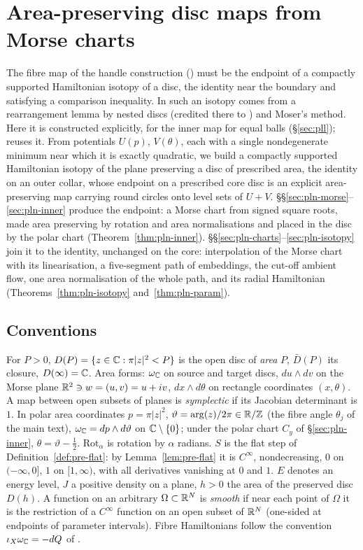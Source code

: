 \section{Area-preserving disc maps from Morse charts}\label{sec:pln}

The fibre map of the handle construction () must be the endpoint of a compactly supported Hamiltonian isotopy of a disc, the identity near the boundary and satisfying a comparison inequality. In \cite{OpenAI2026} such an isotopy comes from a rearrangement lemma by nested discs (credited there to \cite[Lemma~3.2]{SchlenkFolding}) and Moser's method. Here it is constructed explicitly, for the inner map for equal balls (\S\ref{sec:pll}); \cite{SongHD} reuses it. From potentials $U(p)$, $V(\theta)$, each with a single nondegenerate minimum near which it is exactly quadratic, we build a compactly supported Hamiltonian isotopy of the plane preserving a disc of prescribed area, the identity on an outer collar, whose endpoint on a prescribed core disc is an explicit area-preserving map carrying round circles onto level sets of $U+V$. \S\S\ref{sec:pln-morse}--\ref{sec:pln-inner} produce the endpoint: a Morse chart from signed square roots, made area preserving by rotation and area normalisations and placed in the disc by the polar chart (Theorem~\ref{thm:pln-inner}). \S\S\ref{sec:pln-charts}--\ref{sec:pln-isotopy} join it to the identity, unchanged on the core: interpolation of the Morse chart with its linearisation, a five-segment path of embeddings, the cut-off ambient flow, one area normalisation of the whole path, and its radial Hamiltonian (Theorems~\ref{thm:pln-isotopy} and~\ref{thm:pln-param}).

\subsection*{Conventions}

For $P>0$, $D(P)=\{z\in\mathbb{C}:\pi|z|^2<P\}$ is the open disc of \emph{area} $P$, $\bar D(P)$ its closure, $D(\infty)=\mathbb{C}$. Area forms: $\omega_{\mathbb{C}}$ on source and target discs, $du\wedge dv$ on the Morse plane $\mathbb{R}^2\ni w=(u,v)=u+iv$, $dx\wedge d\theta$ on rectangle coordinates $(x,\theta)$. A map between open subsets of planes is \emph{symplectic} if its Jacobian determinant is $1$. In polar area coordinates $p=\pi|z|^2$, $\vartheta=\arg(z)/2\pi\in\mathbb{R}/\mathbb{Z}$ (the fibre angle $\theta_j$ of the main text), $\omega_{\mathbb{C}}=dp\wedge d\vartheta$ on $\mathbb{C}\setminus\{0\}$; under the polar chart $C_y$ of \S\ref{sec:pln-inner}, $\theta=\vartheta-\frac12$. $\mathrm{Rot}_\alpha$ is rotation by $\alpha$ radians. $S$ is the flat step of Definition~\ref{def:pre-flat}: by Lemma~\ref{lem:pre-flat} it is $C^\infty$, nondecreasing, $0$ on $(-\infty,0]$, $1$ on $[1,\infty)$, with all derivatives vanishing at $0$ and $1$. $E$ denotes an energy level, $J$ a positive density on a plane, $h>0$ the area of the preserved disc $D(h)$. A function on an arbitrary $\Omega\subset\mathbb{R}^N$ is \emph{smooth} if near each point of $\Omega$ it is the restriction of a $C^\infty$ function on an open subset of $\mathbb{R}^N$ (one-sided at endpoints of parameter intervals). Fibre Hamiltonians follow the convention $\iota_X\omega_{\mathbb{C}}=-dQ$ of .

